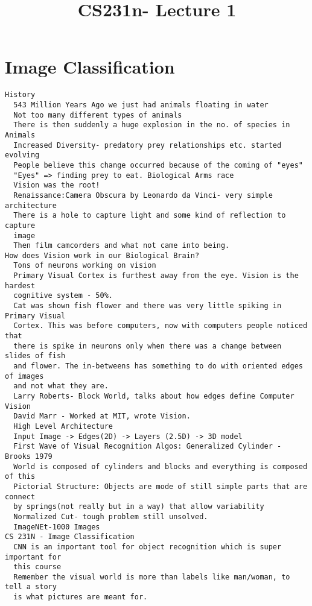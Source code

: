 \documentclass{article}
\begin{document}
\title{CS231n- Lecture 1}
\maketitle
\section{Image Classification}
\begin{lstlisting}
History
  543 Million Years Ago we just had animals floating in water
  Not too many different types of animals
  There is then suddenly a huge explosion in the no. of species in Animals
  Increased Diversity- predatory prey relationships etc. started evolving
  People believe this change occurred because of the coming of "eyes"
  "Eyes" => finding prey to eat. Biological Arms race
  Vision was the root!
  Renaissance:Camera Obscura by Leonardo da Vinci- very simple architecture
  There is a hole to capture light and some kind of reflection to capture
  image
  Then film camcorders and what not came into being.
How does Vision work in our Biological Brain?
  Tons of neurons working on vision
  Primary Visual Cortex is furthest away from the eye. Vision is the hardest
  cognitive system - 50%.
  Cat was shown fish flower and there was very little spiking in Primary Visual
  Cortex. This was before computers, now with computers people noticed that
  there is spike in neurons only when there was a change between slides of fish
  and flower. The in-betweens has something to do with oriented edges of images
  and not what they are.
  Larry Roberts- Block World, talks about how edges define Computer Vision
  David Marr - Worked at MIT, wrote Vision.
  High Level Architecture
  Input Image -> Edges(2D) -> Layers (2.5D) -> 3D model
  First Wave of Visual Recognition Algos: Generalized Cylinder - Brooks 1979
  World is composed of cylinders and blocks and everything is composed of this
  Pictorial Structure: Objects are mode of still simple parts that are connect
  by springs(not really but in a way) that allow variability
  Normalized Cut- tough problem still unsolved.
  ImageNEt-1000 Images
CS 231N - Image Classification
  CNN is an important tool for object recognition which is super important for
  this course
  Remember the visual world is more than labels like man/woman, to tell a story
  is what pictures are meant for.
\end{lstlisting}
\end{document}
